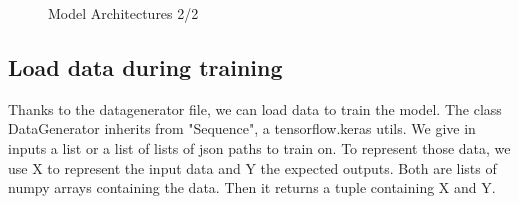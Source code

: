 \documentclass[12pt]{article}
\begin{document}
\begin{figure}[h]
    \hfill %
    \caption{Model Architectures 2/2}
\end{figure}


\subsection{Load data during training}
Thanks to the datagenerator file, we can load data to train the model. The class DataGenerator inherits from "Sequence", a tensorflow.keras utils. We give in inputs a list or a list of lists of json paths to train on. To represent those data, we use X to represent the input data and Y the expected outputs. Both are lists of numpy arrays containing the data. Then it returns a tuple containing X and Y.  
\end{document}
